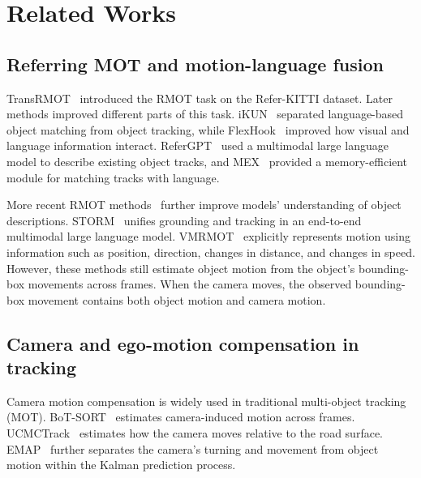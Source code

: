 \documentclass{article}
\begin{document}
\section{Related Works}
\label{sec:related}
\subsection{Referring MOT and motion-language fusion}
TransRMOT~\cite{transrmot} introduced the RMOT task on the Refer-KITTI dataset. Later methods improved different parts of this task. iKUN~\cite{ikun} separated language-based object matching from object tracking, while FlexHook~\cite{flexhook} improved how visual and language information interact. ReferGPT~\cite{refergpt} used a multimodal large language model to describe existing object tracks, and MEX~\cite{mex} provided a memory-efficient module for matching tracks with language.

More recent RMOT methods~\cite{deeprmot} further improve models' understanding of object descriptions. STORM~\cite{storm} unifies grounding and tracking in an end-to-end multimodal large language model. VMRMOT~\cite{vmrmot} explicitly represents motion using information such as position, direction, changes in distance, and changes in speed. However, these methods still estimate object motion from the object's bounding-box movements across frames. When the camera moves, the observed bounding-box movement contains both object motion and camera motion. %


\subsection{Camera and ego-motion compensation in tracking}
Camera motion compensation is widely used in traditional multi-object tracking (MOT). BoT-SORT~\cite{botsort} estimates camera-induced motion across frames. UCMCTrack~\cite{ucmctrack} estimates how the camera moves relative to the road surface. EMAP~\cite{emap} further separates the camera's turning and movement from object motion within the Kalman prediction process.
\end{document}
